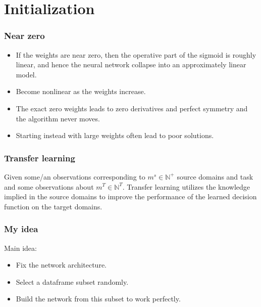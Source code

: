 \section{Initialization}

\begin{frame}
    \frametitle{Near zero}
    \begin{itemize}
        \item If the weights are near zero, 
        then the operative part of the sigmoid is roughly linear,
        and hence the neural network collapse into an approximately linear model. 
    
        \item Become nonlinear as the weights increase. 
        \item The exact zero weights leads to zero derivatives and perfect symmetry and the algorithm never moves.  
        \item Starting instead with large weights often lead to poor solutions.
    \end{itemize}

\end{frame}

\begin{frame}
    \frametitle{Transfer learning}
    \begin{definition}
        Given some/an observations corresponding
        to $m^s \in \mathbb{N}^+$ source domains 
        and task and some observations about 
        $m^T \in \mathbb{N}^T$. 
        Transfer learning utilizes the knowledge implied in the source
        domains to improve the performance of the learned decision function
        on the target domains. 
    \end{definition}

    \cite{SurveyonTransferLearning} 

    \cite{aji-etal-2020-neural}
\end{frame}

\begin{frame}
    \frametitle{My idea}
    Main idea:
    \begin{itemize}
        \item Fix the network architecture. 
        \item Select a dataframe subset randomly. 
        \item Build the network from this subset to work perfectly. 
    \end{itemize} 
\end{frame}

